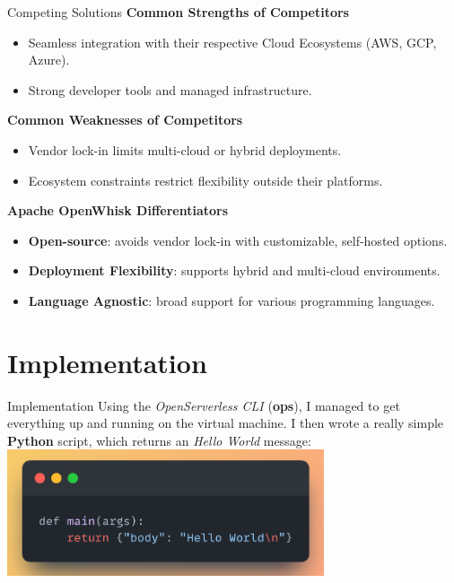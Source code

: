 \documentclass[aspectratio=169]{beamer}
\begin{document}
\begin{frame}{Competing Solutions}
\textbf{Common Strengths of Competitors}
\begin{itemize}
    \item Seamless integration with their respective Cloud Ecosystems (AWS, GCP, Azure).
    \item Strong developer tools and managed infrastructure.
\end{itemize}
\textbf{Common Weaknesses of Competitors}
\begin{itemize}
    \item Vendor lock-in limits multi-cloud or hybrid deployments.
    \item Ecosystem constraints restrict flexibility outside their platforms.
\end{itemize}
\textbf{Apache OpenWhisk Differentiators}
\begin{itemize}
    \item \textbf{Open-source}: avoids vendor lock-in with customizable, self-hosted options.
    \item \textbf{Deployment Flexibility}: supports hybrid and multi-cloud environments.
    \item \textbf{Language Agnostic}: broad support for various programming languages.
\end{itemize}
\end{frame}

\section{Implementation}
\begin{frame}{Implementation}
Using the \textit{OpenServerless CLI} (\textbf{ops}), I managed to get everything up and running on the virtual machine. I then wrote a really simple \textbf{Python} script, which returns an \textit{Hello World} message:\vspace{14pt}\\
\centering
\includegraphics[width=0.7\textwidth]{img/code_snippet.png}
\end{frame}
\end{document}
